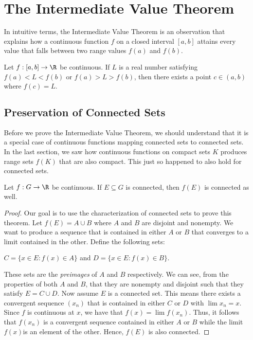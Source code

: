 \section{The Intermediate Value Theorem}

In intuitive terms, the Intermediate Value Theorem is an observation that explains how a continuous function \( f \) on a closed interval \( [a,b] \) attains every value that falls between two range values \( f(a) \) and \( f(b) \).


\begin{tcolorbox}
    \begin{thm}
    Let \( f: [a,b] \to \R  \) be continuous. If \( L  \) is a real number satisfying \( f(a) < L < f(b) \) or \( f(a) > L > f(b) \), then there exists a point \( c \in (a,b) \) where \( f(c) = L  \).
    \end{thm}
\end{tcolorbox}

\subsection{Preservation of Connected Sets}

Before we prove the Intermediate Value Theorem, we should understand that it is a special case of continuous functions mapping connected sets to connected sets. In the last section, we saw how continuous functions on compact sets \( K  \) produces range sets \( f(K) \) that are also compact. This just so happened to also hold for connected sets.


\begin{tcolorbox}
    \begin{thm}
    Let \( f: G \to \R  \) be continuous. If \( E \subseteq G  \) is connected, then \( f(E) \) is connected as well.
    \end{thm}
\end{tcolorbox}

\begin{proof}
Our goal is to use the characterization of connected sets to prove this theorem. Let \( f(E) = A \cup B  \) where \( A  \) and \( B  \) are disjoint and nonempty. We want to produce a sequence that is contained in either \( A  \) or \( B  \) that converges to a limit contained in the other. Define the following sets:
\begin{center}
    \( C = \{ x \in E: f(x) \in A  \}  \) and \( D = \{ x \in E : f(x) \in B  \}  \).
\end{center}
These sets are the \textit{preimages} of \( A  \) and \( B  \) respectively. We can see, from the properties of both \( A  \) and \( B  \), that they are nonempty and disjoint such that they satisfy \( E = C \cup D  \). Now assume \( E  \) is a connected set. This means there exists a convergent sequence \( (x_n)  \) that is contained in either \( C  \) or \( D  \) with \( \lim x_n = x  \). Since \( f \) is continuous at \( x  \), we have that \( f(x) = \lim f(x_n) \). Thus, it follows that \( f(x_n) \) is a convergent sequence contained in either \( A  \) or \( B  \) while the limit \( f(x)  \)is an element of the other. Hence, \( f(E ) \) is also connected.
\end{proof}

